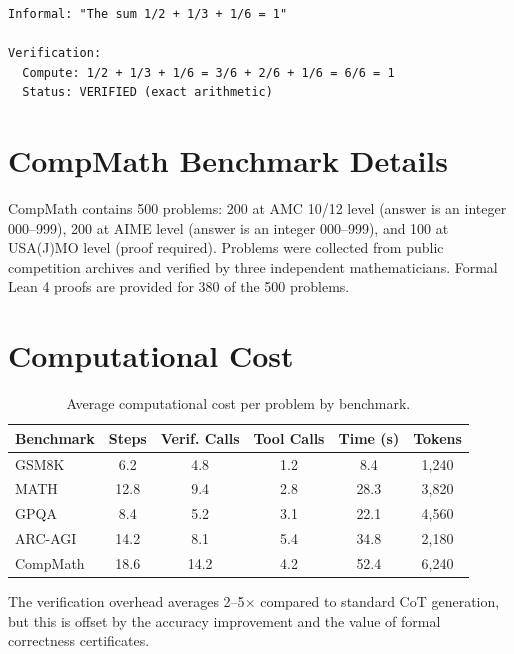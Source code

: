 \documentclass[11pt,a4paper]{article}
\begin{document}
\begin{lstlisting}[caption={Example: numerical verification},language={}]
Informal: "The sum 1/2 + 1/3 + 1/6 = 1"

Verification:
  Compute: 1/2 + 1/3 + 1/6 = 3/6 + 2/6 + 1/6 = 6/6 = 1
  Status: VERIFIED (exact arithmetic)
\end{lstlisting}

\section{CompMath Benchmark Details}
\label{app:compmath}

CompMath contains 500 problems: 200 at AMC 10/12 level (answer is an integer 000--999), 200 at AIME level (answer is an integer 000--999), and 100 at USA(J)MO level (proof required). Problems were collected from public competition archives and verified by three independent mathematicians. Formal Lean 4 proofs are provided for 380 of the 500 problems.

\section{Computational Cost}
\label{app:cost}

\begin{table}[h]
\centering
\caption{Average computational cost per problem by benchmark.}
\label{tab:cost}
\begin{tabular}{lccccc}
\toprule
\textbf{Benchmark} & \textbf{Steps} & \textbf{Verif. Calls} & \textbf{Tool Calls} & \textbf{Time (s)} & \textbf{Tokens} \\
\midrule
GSM8K & 6.2 & 4.8 & 1.2 & 8.4 & 1,240 \\
MATH & 12.8 & 9.4 & 2.8 & 28.3 & 3,820 \\
GPQA & 8.4 & 5.2 & 3.1 & 22.1 & 4,560 \\
ARC-AGI & 14.2 & 8.1 & 5.4 & 34.8 & 2,180 \\
CompMath & 18.6 & 14.2 & 4.2 & 52.4 & 6,240 \\
\bottomrule
\end{tabular}
\end{table}

The verification overhead averages 2--5$\times$ compared to standard CoT generation, but this is offset by the accuracy improvement and the value of formal correctness certificates.
\end{document}
